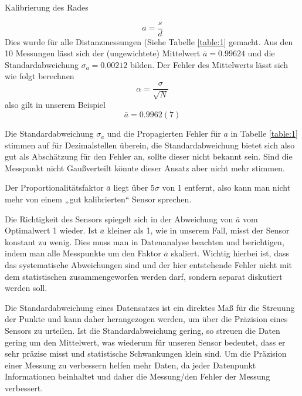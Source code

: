 \documentclass{alex_gp}
\begin{document}
\begin{mybox}{Kalibrierung des Rades}
\begin{vwcol}[widths={0.3, 0.7}, sep=.8cm, justify=flush,rule=0pt, indent=1em, lines=20]
\begin{minipage}[t][0cm][t]{0.64\textwidth}
\begin{equation}
					a = \frac{s}{d}
			\end{equation}
			Dies wurde für alle Distanzmessungen (Siehe Tabelle \ref{table:1} gemacht. Aus den 10 Messungen lässt sich der (ungewichtete) Mittelwert \( \bar{a} = 0.99624 \) und die Standardabweichung \( \sigma_a = 0.00212 \) bilden. Der Fehler des Mittelwerts lässt sich wie folgt berechnen
			\begin{equation}\label{eqn:alp}
					\alpha = \frac{\sigma}{\sqrt{N}}
			\end{equation}
			also gilt in unserem Beispiel
			\begin{equation}\label{eqn:afin}
					\bar{a} = 0.9962(7)
			\end{equation}
		\end{minipage}
	\end{vwcol}
	\vspace{-0.5cm}
	Die Standardabweichung \( \sigma_a \) und die Propagierten Fehler für \( a \) in Tabelle \ref{table:1} stimmen auf für Dezimalstellen überein, die Standardabweichung bietet sich also gut als Abschätzung für den Fehler an, sollte dieser nicht bekannt sein. Sind die Messpunkt nicht Gaußverteilt könnte dieser Ansatz aber nicht mehr stimmen. \par 
	
	Der Proportionalitätsfaktor \( \bar{a} \) liegt über \( 5 \sigma \) von 1 entfernt, also kann man nicht mehr von einem „gut kalibrierten“ Sensor sprechen. \par 
	
	Die Richtigkeit des Sensors spiegelt sich in der Abweichung von \( \bar{a} \) vom Optimalwert 1 wieder. Ist \( \bar{a} \) kleiner als 1, wie in unserem Fall, misst der Sensor konstant zu wenig. Dies muss man in Datenanalyse beachten und berichtigen, indem man alle Messpunkte um den Faktor \( \bar{a} \) skaliert. Wichtig hierbei ist, dass das systematische Abweichungen sind und der hier entstehende Fehler nicht mit dem statistischen zusammengeworfen werden darf, sondern separat diskutiert werden soll. \par
	
	Die Standardabweichung eines Datensatzes ist ein direktes Maß für die Streuung der Punkte und kann daher herangezogen werden, um über die Präzision eines Sensors zu urteilen. Ist die Standardabweichung gering, so streuen die Daten gering um den Mittelwert, was wiederum für unseren Sensor bedeutet, dass er sehr präzise misst und statistische Schwankungen klein sind. Um die Präzision einer Messung zu verbessern helfen mehr Daten, da jeder Datenpunkt Informationen beinhaltet und daher die Messung/den Fehler der Messung verbessert.
	
\end{mybox}
\end{document}

